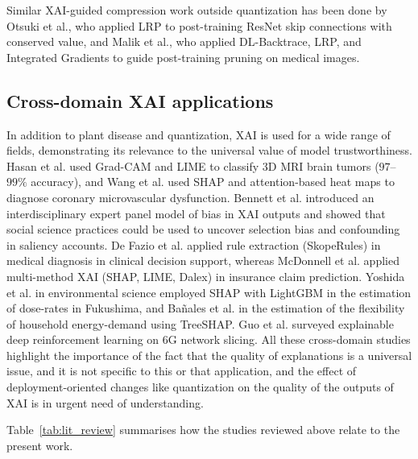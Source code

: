 \documentclass[fleqn,10pt]{wlscirep}
\begin{document}
Similar XAI-guided compression work outside quantization has been done by Otsuki et al.\cite{Otsuki2024lrp}, who applied LRP to post-training ResNet skip connections with conserved value, and Malik et al.\cite{Malik2025pruning}, who applied DL-Backtrace, LRP, and Integrated Gradients to guide post-training pruning on medical images.

\subsection*{Cross-domain XAI applications}

In addition to plant disease and quantization, XAI is used for a wide range of fields, demonstrating its relevance to the universal value of model trustworthiness. Hasan et al.\cite{Hasan2026brain} used Grad-CAM and LIME to classify 3D MRI brain tumors ($97$--$99\%$ accuracy), and Wang et al.\cite{Wang2025coronary} used SHAP and attention-based heat maps to diagnose coronary microvascular dysfunction. Bennett et al.\cite{Bennett2026xai} introduced an interdisciplinary expert panel model of bias in XAI outputs and showed that social science practices could be used to uncover selection bias and confounding in saliency accounts. De Fazio et al.\cite{DeFazio2026care} applied rule extraction (SkopeRules) in medical diagnosis in clinical decision support, whereas McDonnell et al.\cite{McDonnell2026insurance} applied multi-method XAI (SHAP, LIME, Dalex) in insurance claim prediction. Yoshida et al.\cite{Yoshida2026fukushima} in environmental science employed SHAP with LightGBM in the estimation of dose-rates in Fukushima, and Ba\~{n}ales et al.\cite{Banales2026energy} in the estimation of the flexibility of household energy-demand using TreeSHAP. Guo et al.\cite{Guo2025sixg} surveyed explainable deep reinforcement learning on 6G network slicing. All these cross-domain studies highlight the importance of the fact that the quality of explanations is a universal issue, and it is not specific to this or that application, and the effect of deployment-oriented changes like quantization on the quality of the outputs of XAI is in urgent need of understanding.

Table~\ref{tab:lit_review} summarises how the studies reviewed above relate to the present work.
\end{document}
